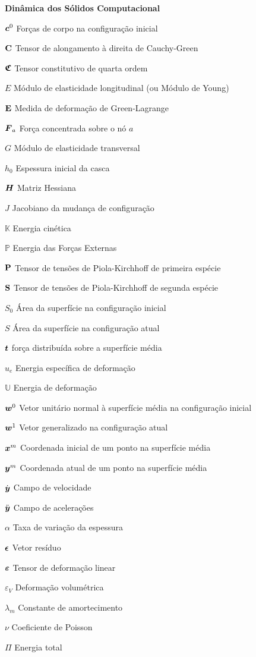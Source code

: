 \begin{simbolos}
  \item[\textbf{Dinâmica dos Sólidos Computacional}]
  \item[$\boldsymbol{c}^0$] Forças de corpo na configuração inicial
  \item[$\mathbf{C}$] Tensor de alongamento à direita de Cauchy-Green
  \item[$\boldsymbol{\mathfrak{C}}$] Tensor constitutivo de quarta ordem
  \item[$E$] Módulo de elasticidade longitudinal (ou Módulo de Young)
  \item[$\mathbf{E}$] Medida de deformação de Green-Lagrange
  \item[$\boldsymbol{F}_a$] Força concentrada sobre o nó $a$
  \item[$G$] Módulo de elasticidade transversal
  \item[$h_0$] Espessura inicial da casca
  \item[$\boldsymbol{H}$] Matriz Hessiana
  \item[$J$] Jacobiano da mudança de configuração
  \item[$\mathbb{K}$] Energia cinética
  \item[$\mathbb{P}$] Energia das Forças Externas
  \item[$\mathbf{P}$] Tensor de tensões de Piola-Kirchhoff de primeira espécie
  \item[$\mathbf{S}$] Tensor de tensões de Piola-Kirchhoff de segunda espécie
  \item[$S_0$] Área da superfície na configuração inicial
  \item[$S$] Área da superfície na configuração atual
  \item[$\boldsymbol{t}$] força distribuída sobre a superfície média
  \item[$u_e$] Energia específica de deformação
  \item[$\mathbb{U}$] Energia de deformação
  \item[$\boldsymbol{w}^0$] Vetor unitário normal à superfície média na configuração inicial
  \item[$\boldsymbol{w}^1$] Vetor generalizado na configuração atual
  \item[$\boldsymbol{x}^m$] Coordenada inicial de um ponto na superfície média
  \item[$\boldsymbol{y}^m$] Coordenada atual de um ponto na superfície média
  \item[$\dot{\boldsymbol{y}}$] Campo de velocidade
  \item[$\ddot{\boldsymbol{y}}$] Campo de acelerações
  \item[$\alpha$] Taxa de variação da espessura
  \item[$\boldsymbol{\epsilon}$] Vetor resíduo
  \item[$\boldsymbol{\varepsilon}$] Tensor de deformação linear
  \item[$\varepsilon_V$] Deformação volumétrica
  \item[$\lambda_m$] Constante de amortecimento
  \item[$\nu$] Coeficiente de Poisson
  \item[$\Pi$] Energia total


\end{simbolos}
